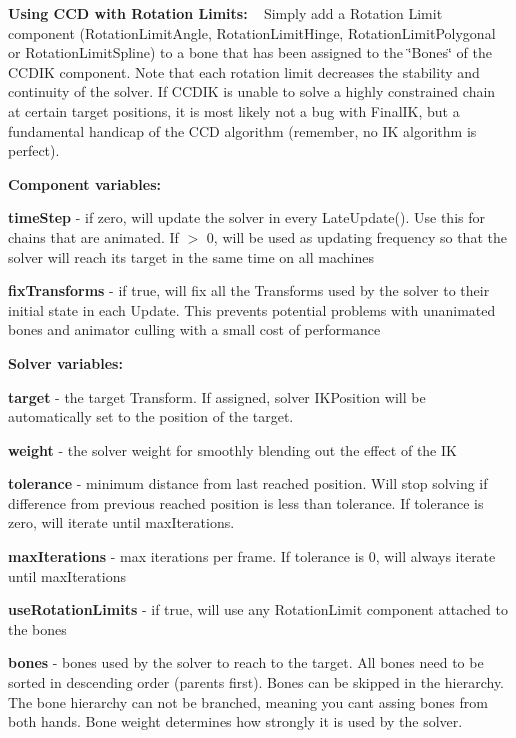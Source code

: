 {\bfseries Using C\+CD with Rotation Limits\+:} ~\newline
Simply add a Rotation Limit component (Rotation\+Limit\+Angle, Rotation\+Limit\+Hinge, Rotation\+Limit\+Polygonal or Rotation\+Limit\+Spline) to a bone that has been assigned to the \char`\"{}\+Bones\char`\"{} of the C\+C\+D\+IK component. Note that each rotation limit decreases the stability and continuity of the solver. If C\+C\+D\+IK is unable to solve a highly constrained chain at certain target positions, it is most likely not a bug with Final\+IK, but a fundamental handicap of the C\+CD algorithm (remember, no IK algorithm is perfect).

 {\bfseries Component variables\+:}
\begin{DoxyItemize}
\item {\bfseries time\+Step} -\/ if zero, will update the solver in every Late\+Update(). Use this for chains that are animated. If $>$ 0, will be used as updating frequency so that the solver will reach its target in the same time on all machines
\item {\bfseries fix\+Transforms} -\/ if true, will fix all the Transforms used by the solver to their initial state in each Update. This prevents potential problems with unanimated bones and animator culling with a small cost of performance
\end{DoxyItemize}

{\bfseries Solver variables\+:}
\begin{DoxyItemize}
\item {\bfseries target} -\/ the target Transform. If assigned, solver I\+K\+Position will be automatically set to the position of the target.
\item {\bfseries weight} -\/ the solver weight for smoothly blending out the effect of the IK
\item {\bfseries tolerance} -\/ minimum distance from last reached position. Will stop solving if difference from previous reached position is less than tolerance. If tolerance is zero, will iterate until max\+Iterations.
\item {\bfseries max\+Iterations} -\/ max iterations per frame. If tolerance is 0, will always iterate until max\+Iterations
\item {\bfseries use\+Rotation\+Limits} -\/ if true, will use any Rotation\+Limit component attached to the bones
\item {\bfseries bones} -\/ bones used by the solver to reach to the target. All bones need to be sorted in descending order (parents first). Bones can be skipped in the hierarchy. The bone hierarchy can not be branched, meaning you cant assing bones from both hands. Bone weight determines how strongly it is used by the solver.
\end{DoxyItemize}

 